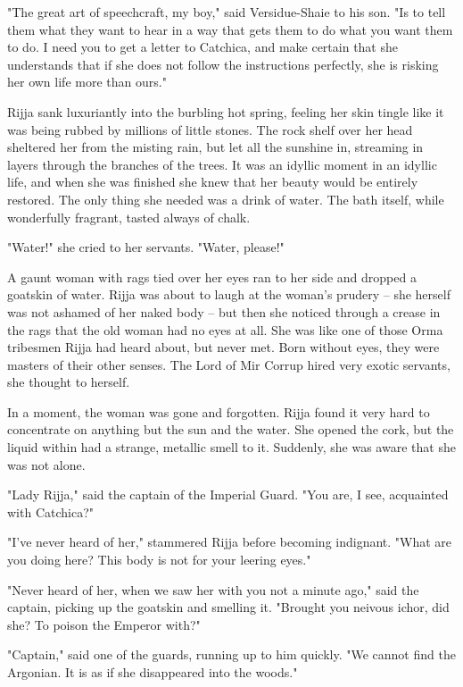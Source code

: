 "The great art of speechcraft, my boy," said Versidue-Shaie to his son. "Is to tell them what they want to hear in a way that gets them to do what you want them to do. I need you to get a letter to Catchica, and make certain that she understands that if she does not follow the instructions perfectly, she is risking her own life more than ours."

Rijja sank luxuriantly into the burbling hot spring, feeling her skin tingle like it was being rubbed by millions of little stones. The rock shelf over her head sheltered her from the misting rain, but let all the sunshine in, streaming in layers through the branches of the trees. It was an idyllic moment in an idyllic life, and when she was finished she knew that her beauty would be entirely restored. The only thing she needed was a drink of water. The bath itself, while wonderfully fragrant, tasted always of chalk.

"Water!" she cried to her servants. "Water, please!"

A gaunt woman with rags tied over her eyes ran to her side and dropped a goatskin of water. Rijja was about to laugh at the woman's prudery -- she herself was not ashamed of her naked body -- but then she noticed through a crease in the rags that the old woman had no eyes at all. She was like one of those Orma tribesmen Rijja had heard about, but never met. Born without eyes, they were masters of their other senses. The Lord of Mir Corrup hired very exotic servants, she thought to herself.

In a moment, the woman was gone and forgotten. Rijja found it very hard to concentrate on anything but the sun and the water. She opened the cork, but the liquid within had a strange, metallic smell to it. Suddenly, she was aware that she was not alone.

"Lady Rijja," said the captain of the Imperial Guard. "You are, I see, acquainted with Catchica?"

"I've never heard of her," stammered Rijja before becoming indignant. "What are you doing here? This body is not for your leering eyes."

"Never heard of her, when we saw her with you not a minute ago," said the captain, picking up the goatskin and smelling it. "Brought you neivous ichor, did she? To poison the Emperor with?"

"Captain," said one of the guards, running up to him quickly. "We cannot find the Argonian. It is as if she disappeared into the woods."

